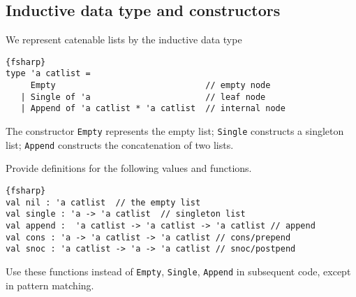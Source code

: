 \subsection*{Inductive data type and constructors}

We represent catenable lists by the inductive data type 
\begin{lstlisting}{fsharp}
type 'a catlist = 
     Empty                              // empty node
   | Single of 'a                       // leaf node
   | Append of 'a catlist * 'a catlist  // internal node
\end{lstlisting}
The constructor \texttt{Empty} represents the empty list; \texttt{Single} constructs a singleton list; \texttt{Append} constructs the concatenation of two lists.

Provide definitions for the following values and functions. 
\begin{lstlisting}{fsharp}
val nil : 'a catlist  // the empty list
val single : 'a -> 'a catlist  // singleton list
val append :  'a catlist -> 'a catlist -> 'a catlist // append
val cons : 'a -> 'a catlist -> 'a catlist // cons/prepend
val snoc : 'a catlist -> 'a -> 'a catlist // snoc/postpend
\end{lstlisting}
Use these functions instead of \verb|Empty|, \verb|Single|, \verb|Append| in subsequent code, except in pattern matching.
